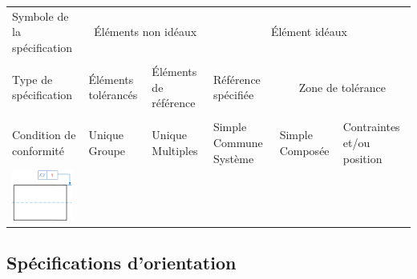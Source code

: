 \documentclass[11pt,oneside]{article}
\begin{document}
\begin{exemple}
\footnotesize{
\begin{center}
\begin{tabular}{|p{}|p{}|p{}|p{}|p{}|p{}|}
\hline
Symbole de la spécification & 
\multicolumn{2}{c|}{Éléments non idéaux} &
\multicolumn{3}{c|}{Élément idéaux} \\
&
\multicolumn{2}{c|}{} &
\multicolumn{3}{c|}{}\\
\hline
Type de spécification & 
Éléments tolérancés &
Éléments de référence & 
Référence spécifiée & 
\multicolumn{2}{c|}{Zone de tolérance} \\
&&&&
\multicolumn{2}{c|}{}\\
\hline
Condition de conformité & 
Unique Groupe & Unique Multiples &
Simple Commune Système &
Simple Composée & 
Contraintes et/ou position \\
\hline
\multirow{12}{*}{\includegraphics[width=2cm]{png/ex_cylindricite}}&&&&&\\
&&&&&\\
&&&&&\\
&&&&&\\
&&&&&\\
&&&&&\\
&&&&&\\
&&&&&\\
&&&&&\\
&&&&&\\
&&&&&\\
&&&&&\\
\hline
\end{tabular}
\end{center}
}
\end{exemple}



\subsection{Spécifications d'orientation}
\end{document}
